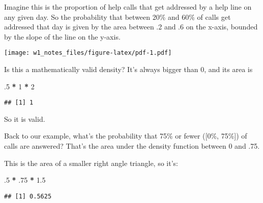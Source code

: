 \documentclass[]{article}
\newenvironment{Shaded}{\begin{snugshade}}{\end{snugshade}}
\newcommand{\DataTypeTok}[1]{\textcolor[rgb]{0.13,0.29,0.53}{#1}}
\newcommand{\DecValTok}[1]{\textcolor[rgb]{0.00,0.00,0.81}{#1}}
\newcommand{\FloatTok}[1]{\textcolor[rgb]{0.00,0.00,0.81}{#1}}
\newcommand{\KeywordTok}[1]{\textcolor[rgb]{0.13,0.29,0.53}{\textbf{#1}}}
\newcommand{\NormalTok}[1]{#1}
\newcommand{\OperatorTok}[1]{\textcolor[rgb]{0.81,0.36,0.00}{\textbf{#1}}}
\newcommand{\StringTok}[1]{\textcolor[rgb]{0.31,0.60,0.02}{#1}}
\begin{document}
Imagine this is the proportion of help calls that get addressed by a
help line on any given day. So the probability that between 20\% and
60\% of calls get addressed that day is given by the area between .2 and
.6 on the x-axis, bounded by the slope of the line on the y-axis.

\begin{Shaded}
\end{Shaded}

\texttt{[image: w1\_notes\_files/figure-latex/pdf-1.pdf]}

Is this a mathematically valid density? It's always bigger than 0, and
its area is

\begin{Shaded}
\begin{Highlighting}[]
\FloatTok{.5} \OperatorTok{*}\StringTok{ }\DecValTok{1} \OperatorTok{*}\StringTok{ }\DecValTok{2}
\end{Highlighting}
\end{Shaded}

\begin{verbatim}
## [1] 1
\end{verbatim}

So it is valid.

Back to our example, what's the probability that 75\% or fewer ({[}0\%,
75\%{]}) of calls are answered? That's the area under the density
function between 0 and .75.

This is the area of a smaller right angle triangle, so it's:

\begin{Shaded}
\begin{Highlighting}[]
\FloatTok{.5} \OperatorTok{*}\StringTok{ }\FloatTok{.75} \OperatorTok{*}\StringTok{ }\FloatTok{1.5}
\end{Highlighting}
\end{Shaded}

\begin{verbatim}
## [1] 0.5625
\end{verbatim}
\end{document}
